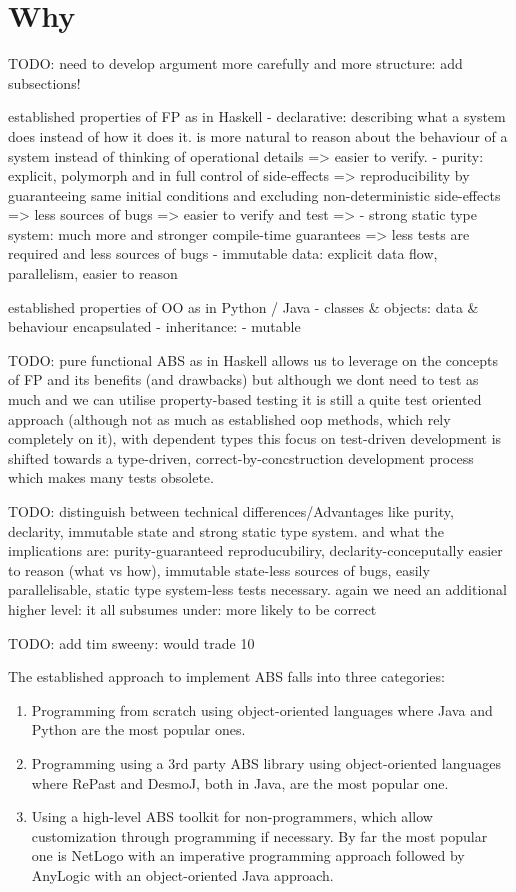 \section{Why}
\label{sect:why}
TODO: need to develop argument more carefully and more structure: add subsections!

established properties of FP as in Haskell
- declarative: describing what a system does instead of how it does it. is more natural to reason about the behaviour of a system instead of thinking of operational details => easier to verify.
- purity: explicit, polymorph and in full control of side-effects => reproducibility by guaranteeing same initial conditions and excluding non-deterministic side-effects => less sources of bugs => easier to verify and test => 
- strong static type system: much more and stronger compile-time guarantees => less tests are required and less sources of bugs 
- immutable data: explicit data flow, parallelism, easier to reason

established properties of OO as in Python / Java
- classes & objects: data & behaviour encapsulated
- inheritance: 
- mutable

TODO: pure functional ABS as in Haskell allows us to leverage on the concepts of FP and its benefits (and drawbacks) but although we dont need to test as much and we can utilise property-based testing it is still a quite test oriented approach (although not as much as established oop methods, which rely completely on it), with dependent types this focus on test-driven development is shifted towards a type-driven, correct-by-concstruction development process which makes many tests obsolete.

TODO: distinguish between technical differences/Advantages like purity, declarity, immutable state and strong static type system. and what the implications are: purity-guaranteed reproducubiliry, declarity-conceputally easier to reason (what vs how), immutable state-less sources of bugs, easily parallelisable, static type system-less tests necessary. again we need an additional higher level: it all subsumes under: more likely to be correct

TODO: add tim sweeny: would trade 10%

The established approach to implement ABS falls into three categories:
\begin{enumerate}
	\item Programming from scratch using object-oriented languages where Java and Python are the most popular ones.
	\item Programming using a 3rd party ABS library using object-oriented languages where RePast and DesmoJ, both in Java, are the most popular one.
	\item Using a high-level ABS toolkit for non-programmers, which allow customization through programming if necessary. By far the most popular one is NetLogo with an imperative programming approach followed by AnyLogic with an object-oriented Java approach.
\end{enumerate}

